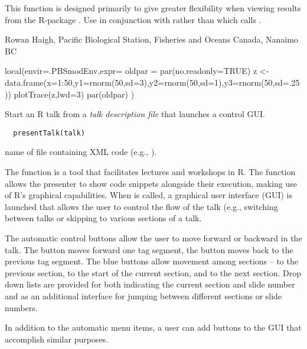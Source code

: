 \documentclass[letterpaper]{book}
\begin{document}
%
\begin{Details}\relax
This function is designed primarily to give greater flexibility when viewing 
results from the R-package . Use  in conjunction with 
 rather than  
which calls .
\end{Details}
%
\begin{Author}\relax
Rowan Haigh, Pacific Biological Station, Fisheries and Oceans Canada, Nanaimo BC
\end{Author}
%
\begin{Examples}
\begin{ExampleCode}
local(envir=.PBSmodEnv,expr={
  oldpar = par(no.readonly=TRUE)
  z <- data.frame(x=1:50,y1=rnorm(50,sd=3),y2=rnorm(50,sd=1),y3=rnorm(50,sd=.25))
  plotTrace(z,lwd=3)
  par(oldpar)
})
\end{ExampleCode}
\end{Examples}
%
\begin{Description}\relax
Start an R talk from a \emph{talk description file} that launches a control GUI.
\end{Description}
%
\begin{Usage}
\begin{verbatim}
  presentTalk(talk)
\end{verbatim}
\end{Usage}
%
\begin{Arguments}
\begin{ldescription}
\item[\code{talk}] name of file containing XML code (e.g., ).
\end{ldescription}
\end{Arguments}
%
\begin{Details}\relax
The function  is a tool that facilitates lectures
and workshops in R.  The function allows the presenter to show code
snippets alongside their execution, making use of R's graphical 
capabilities. When  is called, a graphical user 
interface (GUI) is launched that allows the user to control the 
flow of the talk (e.g., switching between talks or skipping to 
various sections of a talk.

The automatic control buttons allow the user to move forward or 
backward in the talk. The  button moves forward one tag 
segment, the  button moves back to the previous tag 
segment. The blue buttons allow movement among sections -- 
 to the previous section,  to the start of
the current section, and  to the next section. Drop down
lists are provided for both indicating the current section and slide
number and as an additional interface for jumping between different
sections or slide numbers.

In addition to the automatic menu items, a user can add buttons to
the GUI that accomplish similar purposes.
\end{Details}
\end{document}
